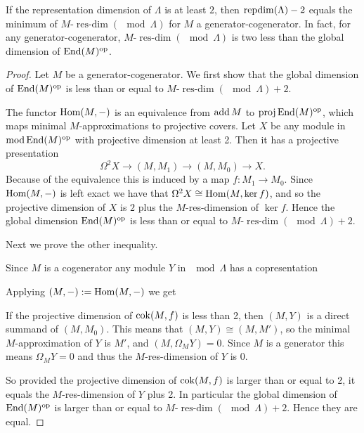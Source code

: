 \begin{prop}\label{prop:repdim_resdim+2}
	If the representation dimension of $\Lambda$ is at least $2$, then $\operatorname{repdim}(\Lambda) - 2$ equals the minimum of $M$-$\operatorname{res-dim}(\mod \Lambda)$ for $M$ a generator-cogenerator. In fact, for any generator-cogenerator, $M$-$\operatorname{res-dim}(\mod \Lambda)$ is two less than the global dimension of $\operatorname{End}(M)^{\operatorname{op}}$.
	\begin{proof}
		Let $M$ be a generator-cogenerator. We first show that the global dimension of $\operatorname{End}(M)^{\operatorname{op}}$ is less than or equal to $M$-$\operatorname{res-dim}(\mod \Lambda) + 2$. 
		
		The functor $\operatorname{Hom}(M, -)$ is an equivalence from $\operatorname{add} M$ to $\operatorname{proj}\operatorname{End}(M)^{\operatorname{op}}$, which maps minimal $M$-approximations to projective covers. Let $X$ be any module in $\operatorname{mod}\operatorname{End}(M)^{\operatorname{op}}$ with projective dimension at least 2. Then it has a projective presentation $$\Omega^2X \to (M,M_1) \to (M,M_0) \to X.$$
		Because of the equivalence this is induced by a map $f\colon M_1\to M_0$. Since $\operatorname{Hom}(M,-)$ is left exact we have that $\Omega^2X \cong \operatorname{Hom}(M, \ker f)$, and so the projective dimension of $X$ is $2$ plus the $M$-res-dimension of $\ker f$. Hence the global dimension $\operatorname{End}(M)^{\operatorname{op}}$ is less than or equal to $M$-$\operatorname{res-dim}(\mod \Lambda) + 2$. 
		
		Next we prove the other inequality.
		
		Since $M$ is a cogenerator any module $Y$ in $\mod\Lambda$ has a copresentation 
		\begin{center}
		\end{center}
		Applying $(M,-) := \operatorname{Hom}(M,-)$ we get
		\begin{center}
		\end{center}
		If the projective dimension of $\operatorname{cok}(M,f)$ is less than 2, then $(M, Y)$ is a direct summand of $(M, M_0)$. This means that $(M,Y) \cong (M, M')$, so the minimal $M$-approximation of $Y$ is $M'$, and $(M, \Omega_M Y) = 0$. Since $M$ is a generator this means $\Omega_M Y = 0$ and thus the $M$-res-dimension of $Y$ is 0.
		
		So provided the projective dimension of $\operatorname{cok}(M,f)$ is larger than or equal to 2, it equals the $M$-res-dimension of $Y$ plus 2. In particular the global dimension of $\operatorname{End}(M)^{\operatorname{op}}$ is larger than or equal to $M$-$\operatorname{res-dim}(\mod \Lambda) + 2$. Hence they are equal.
	\end{proof}
\end{prop}

